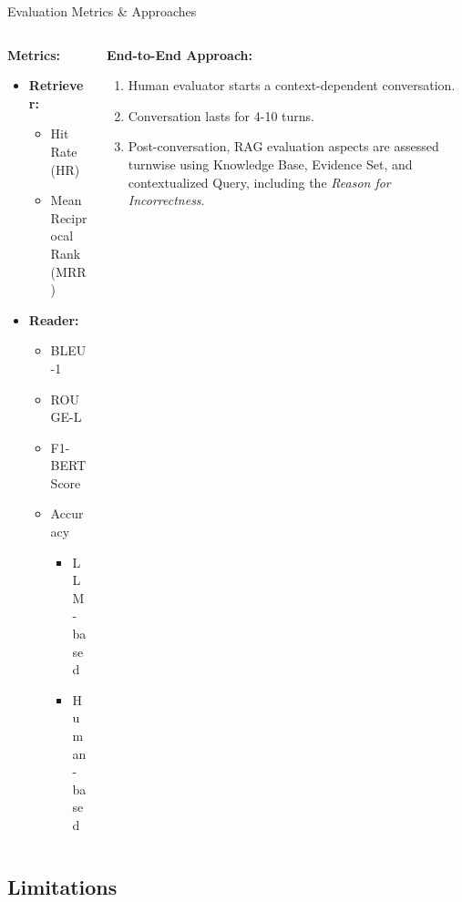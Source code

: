 \documentclass{beamer}
\begin{document}
\begin{frame}{Evaluation Metrics \& Approaches}
  \begin{columns}[T] %
    \begin{column}{.5\textwidth}
      \textbf{Metrics:}
      \begin{itemize}
        \item \textbf{Retriever:}
          \begin{itemize}
            \item Hit Rate (HR)
            \item Mean Reciprocal Rank (MRR)
          \end{itemize}
        \item \textbf{Reader:}
          \begin{itemize}
            \item BLEU-1
            \item ROUGE-L
            \item F1-BERTScore
            \item Accuracy
            \begin{itemize}
              \item LLM-based
              \item Human-based
            \end{itemize}
          \end{itemize}
      \end{itemize}
    \end{column}
    \begin{column}{.5\textwidth}
      \textbf{End-to-End Approach:}
      \begin{enumerate}
        \item Human evaluator starts a context-dependent conversation.
        \item Conversation lasts for 4-10 turns.
        \item Post-conversation, RAG evaluation aspects are assessed turnwise using Knowledge Base, Evidence Set, and contextualized Query, including the \textit{Reason for Incorrectness}.
      \end{enumerate}
    \end{column}
  \end{columns}
\end{frame}

\subsection{Limitations}
\end{document}
